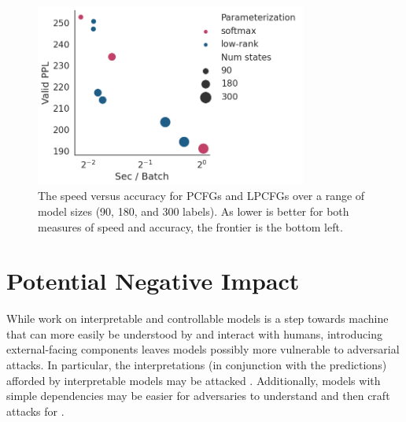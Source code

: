 \documentclass{article}
\begin{document}
\begin{figure}[H]
\centering
\includegraphics[height=6cm]{imgs/hmm/pcfg-speed-accuracy.png}
\caption{
\label{fig:pcfg-frontier}
The speed versus accuracy for PCFGs and LPCFGs over a range of model sizes
(90, 180, and 300 labels).
As lower is better for both measures of speed and accuracy, the frontier is the bottom left.
}
\end{figure}

\section{Potential Negative Impact}
\label{sec:impact}
While work on interpretable and controllable models is a step towards machine that can more easily be understood by and interact with humans, introducing external-facing components leaves models possibly more vulnerable to adversarial attacks. In particular, the interpretations (in conjunction with the predictions) afforded by interpretable models may be attacked \citep{adv-interp}. Additionally, models with simple dependencies may be easier for adversaries to understand and then craft attacks for \citep{Zhang2021LabelFA,adv-phmm}.
\end{document}
